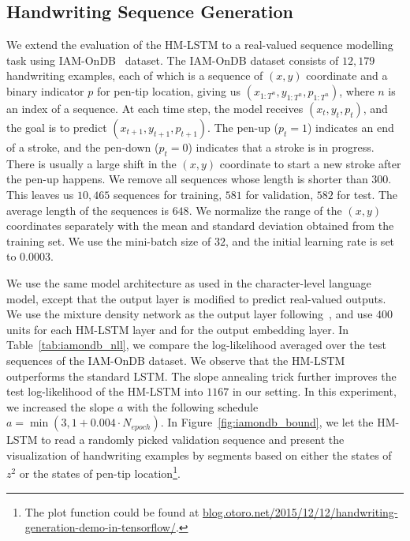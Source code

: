 \documentclass{article} %
\begin{document}
\subsection{Handwriting Sequence Generation}
We extend the evaluation of the HM-LSTM to a real-valued sequence modelling task using IAM-OnDB~\citep{liwicki2005iam} dataset.
The IAM-OnDB dataset consists of $12,179$ handwriting examples, each of which is a sequence of 
$(x,y)$ coordinate and a binary indicator $p$ for pen-tip location, giving us $(x_{1:T^n},y_{1:T^n}, p_{1:T^n})$, where $n$ is an index of a sequence.
At each time step, the model receives $(x_t,y_t,p_t)$, and the goal is to predict $(x_{t+1},y_{t+1},p_{t+1})$.
The pen-up ($p_t=1$) indicates an end of a stroke, and the pen-down ($p_t=0$)  indicates that a stroke is in progress. 
There is usually a large shift in the $(x,y)$ coordinate to start a new stroke after the pen-up happens.
We remove all sequences whose length is shorter than $300$. 
This leaves us $10,465$ sequences for training, $581$ for validation, $582$ for test. 
The average length of the sequences is $648$. 
We normalize the range of the $(x,y)$ coordinates separately with the mean and standard deviation obtained from the training set.
We use the mini-batch size of $32$, and the initial learning rate is set to $0.0003$.

We use the same model architecture as used in the character-level language model,
except that the output layer is modified to predict real-valued outputs. 
We use the mixture density network as the output layer following~\citet{graves2013generating},
and use $400$ units for each HM-LSTM layer and for the output embedding layer.
In Table~\ref{tab:iamondb_nll}, we compare the log-likelihood averaged over the test sequences of the IAM-OnDB dataset. 
We observe that the HM-LSTM outperforms the standard LSTM.
The slope annealing trick further improves the test log-likelihood of the HM-LSTM into $1167$ in our setting.
In this experiment, we increased the slope $a$ with the following schedule {\small $a=\min\left(3, 1+0.004\cdot N_{epoch}\right)$}.
In Figure~\ref{fig:iamondb_bound}, we let the HM-LSTM to read a randomly picked validation sequence 
and present the visualization of handwriting examples by segments based on either the states of $z^2$ or
the states of pen-tip location\footnote{\scriptsize The plot function could be found at \url{blog.otoro.net/2015/12/12/handwriting-generation-demo-in-tensorflow/}.}.
\end{document}
